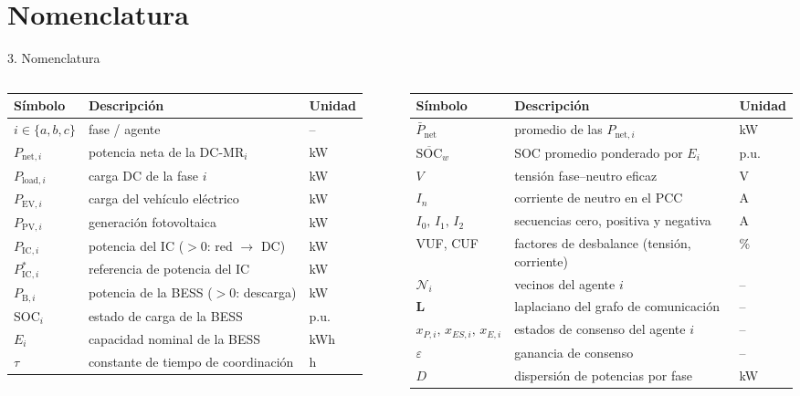 \documentclass[aspectratio=169,11pt]{beamer}
\newcommand{\Pic}[1]{P_{\mathrm{IC},#1}}
\newcommand{\Picr}[1]{P^{*}_{\mathrm{IC},#1}}
\newcommand{\Pnet}[1]{P_{\mathrm{net},#1}}
\newcommand{\Pbat}[1]{P_{\mathrm{B},#1}}
\newcommand{\Pnetm}{\bar P_{\mathrm{net}}}
\newcommand{\SOC}[1]{\mathrm{SOC}_{#1}}
\newcommand{\SOCw}{\overline{\mathrm{SOC}}_{w}}
\begin{document}
\section{Nomenclatura}
\begin{frame}{3. Nomenclatura}
  \scriptsize\renewcommand{\arraystretch}{1.12}
  \begin{columns}[T]
    \begin{tabular}{@{}lll@{}}
      \toprule
      Símbolo & Descripción & Unidad \\ \midrule
      $i\in\{a,b,c\}$ & fase / agente & -- \\
      $\Pnet{i}$ & potencia neta de la DC-MR$_i$ & kW \\
      $P_{\mathrm{load},i}$ & carga DC de la fase $i$ & kW \\
      $P_{\mathrm{EV},i}$ & carga del vehículo eléctrico & kW \\
      $P_{\mathrm{PV},i}$ & generación fotovoltaica & kW \\
      $\Pic{i}$ & potencia del IC ($>0$: red $\to$ DC) & kW \\
      $\Picr{i}$ & referencia de potencia del IC & kW \\
      $\Pbat{i}$ & potencia de la BESS ($>0$: descarga) & kW \\
      $\SOC{i}$ & estado de carga de la BESS & p.u. \\
      $E_i$ & capacidad nominal de la BESS & kWh \\
      $\tau$ & constante de tiempo de coordinación & h \\ \bottomrule
    \end{tabular}
    \begin{tabular}{@{}lll@{}}
      \toprule
      Símbolo & Descripción & Unidad \\ \midrule
      $\Pnetm$ & promedio de las $\Pnet{i}$ & kW \\
      $\SOCw$ & SOC promedio ponderado por $E_i$ & p.u. \\
      $V$ & tensión fase--neutro eficaz & V \\
      $I_n$ & corriente de neutro en el PCC & A \\
      $I_0,\,I_1,\,I_2$ & secuencias cero, positiva y negativa & A \\
      VUF, CUF & factores de desbalance (tensión, corriente) & \% \\
      $\mathcal{N}_i$ & vecinos del agente $i$ & -- \\
      $\bm L$ & laplaciano del grafo de comunicación & -- \\
      $x_{P,i},\,x_{ES,i},\,x_{E,i}$ & estados de consenso del agente $i$ & -- \\
      $\varepsilon$ & ganancia de consenso & -- \\
      $D$ & dispersión de potencias por fase & kW \\ \bottomrule
    \end{tabular}
  \end{columns}
\end{frame}
\end{document}
